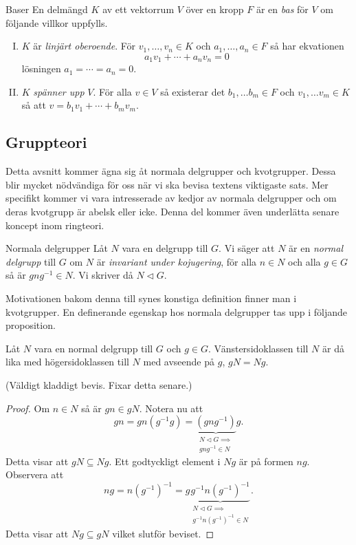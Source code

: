 \documentclass{article}
\theoremstyle{definition}
\begin{document}
\begin{mydef}{Baser}{}
  En delmängd $K$ av ett vektorrum $V$ över en kropp $F$ är en \textit{bas} för $V$ om följande villkor uppfylls.  
  \begin{enumerate}[I)]
    \item $K$ är \textit{linjärt oberoende}. För $v_1, \ldots, v_n \in K$ och $a_1, \ldots, a_n \in F$ så har ekvationen 
    \[a_1v_1 + \cdots + a_n v_n = 0\]
    lösningen $a_1 = \cdots = a_n = 0$.
    \item $K$ \textit{spänner upp} $V$. För alla $v \in V$ så existerar det $b_1, \ldots b_m \in F$ och $v_1, \ldots v_m \in K$ så att 
    $v = b_1 v_1 + \cdots + b_m v_m$.
  \end{enumerate}
\end{mydef}

\subsection{Gruppteori}
Detta avsnitt kommer ägna sig åt normala delgrupper och kvotgrupper. Dessa blir mycket nödvändiga för oss när vi ska bevisa textens viktigaste sats. 
Mer specifikt kommer vi vara intresserade av kedjor av normala delgrupper och om deras kvotgrupp är abelsk eller icke. Denna 
del kommer även underlätta senare koncept inom ringteori.

\begin{mydef}{Normala delgrupper}{}
  Låt $N$ vara en delgrupp till $G$. Vi säger att $N$ är 
  en \textit{normal delgrupp} till $G$ om $N$ är 
  \textit{invariant under kojugering}, för alla $n \in N$ och 
  alla $g \in G$ så är $gng^{-1} \in N$. Vi skriver då $N \triangleleft G.$
\end{mydef}
Motivationen bakom denna till synes konstiga definition finner man i kvotgrupper. 
En definerande egenskap hos normala delgrupper tas upp i följande proposition.

\hypertarget{prop1}{}
\begin{myprop}{}{}
  Låt $N$ vara en normal delgrupp till $G$ och $g \in G$. Vänstersidoklassen till $N$ är då lika med högersidoklassen till $N$ med avseende på $g$, 
  $gN = Ng.$
\end{myprop}
(Väldigt kladdigt bevis. Fixar detta senare.)
\begin{proof}
  Om $n \in N$ så är $gn \in gN$. Notera nu att 
  \begin{equation*}
    gn = gn(g^{-1}g) = \underbrace{(gng^{-1})}_{ \substack{N \triangleleft G  \implies \\ gng^{-1} \in N}} g.
  \end{equation*}
  Detta visar att $gN \subseteq Ng.$ Ett godtyckligt element i $Ng$ är på formen $ng$. Observera att 
  \begin{equation*}
    ng = n(g^{-1})^{-1} = g \underbrace{g^{-1} {n(g^{-1})^{-1}}}_{\substack{N \triangleleft G  \implies \\ g^{-1} {n(g^{-1})^{-1} \in N}}}.
  \end{equation*}
  Detta visar att $Ng \subseteq gN$ vilket slutför beviset.
\end{proof}
\end{document}
